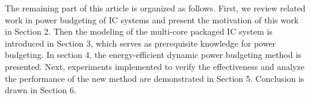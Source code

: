 The remaining part of this article is organized as follows. First, we review related work in power budgeting of IC systems and present the motivation of this work in Section 2. Then the modeling of the multi-core packaged IC system is introduced in Section 3, which serves as prerequisite knowledge for power budgeting. In section 4, the energy-efficient dynamic power budgeting method is presented. Next, experiments implemented to verify the effectiveness and analyze the performance of the new method are demonstrated in Section 5. Conclusion is drawn in Section 6.